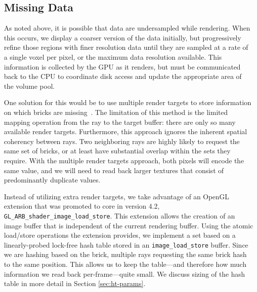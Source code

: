 

\subsection{Missing Data}

As noted above, it is possible that data are undersampled while
rendering.  When this occurs, we display a coarser version of the data
initially, but progressively refine those regions with finer resolution
data until they are sampled at a rate of a single voxel per pixel, or
the maximum data resolution available.  This information is collected
by the GPU as it renders, but must be communicated back to the CPU to
coordinate disk access and update the appropriate area of the volume
pool.

One solution for this would be to use multiple render targets to store
information on which bricks are missing~\cite{Crassin:2009:Gigavoxels}.
The limitation of this method is the limited mapping operation from
the ray to the target buffer: there are only so many available render
targets.
Furthermore, this approach ignores the inherent spatial coherency
between rays.  Two neighboring rays are highly likely to request the
same set of bricks, or at least have substantial overlap within the
sets they require.  With the multiple render targets approach, both
pixels will encode the same value, and we will need to read back larger
textures that consist of predominantly duplicate values.

Instead of utilizing extra render targets, we take advantage of an
OpenGL extension that was promoted to core in version 4.2,
\texttt{GL\_ARB\_shader\_image\_load\_store}.  This extension allows
the creation of an image buffer that is independent of the current
rendering buffer.  Using the atomic load/store operations the extension
provides, we implement a set based on a linearly-probed lock-free hash
table stored in an \texttt{image\_load\_store} buffer.  Since we are
hashing based on the brick, multiple rays requesting the same brick hash
to the same position.  This allows us to keep the table---and therefore
how much information we read back per-frame---quite small.  We discuss
sizing of the hash table in more detail in
Section \ref{sec:ht-params}.

